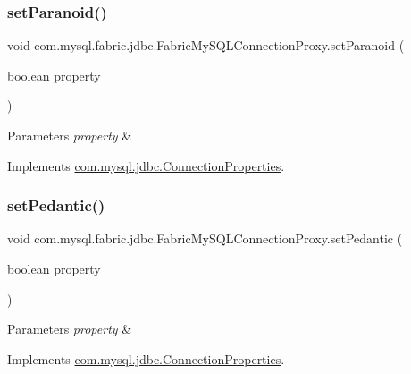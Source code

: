 \subsubsection{\texorpdfstring{set\+Paranoid()}{setParanoid()}}
{\footnotesize\ttfamily void com.\+mysql.\+fabric.\+jdbc.\+Fabric\+My\+S\+Q\+L\+Connection\+Proxy.\+set\+Paranoid (\begin{DoxyParamCaption}\item[{boolean}]{property }\end{DoxyParamCaption})}


\begin{DoxyParams}{Parameters}
{\em property} & \\
\hline
\end{DoxyParams}


Implements \mbox{\hyperlink{interfacecom_1_1mysql_1_1jdbc_1_1_connection_properties_a01cf4f506ad942b96a36708c33221a48}{com.\+mysql.\+jdbc.\+Connection\+Properties}}.

\mbox{\label{classcom_1_1mysql_1_1fabric_1_1jdbc_1_1_fabric_my_s_q_l_connection_proxy_a48c0e82fdcea0d378436b44c8e7d5fd9}} 
\subsubsection{\texorpdfstring{set\+Pedantic()}{setPedantic()}}
{\footnotesize\ttfamily void com.\+mysql.\+fabric.\+jdbc.\+Fabric\+My\+S\+Q\+L\+Connection\+Proxy.\+set\+Pedantic (\begin{DoxyParamCaption}\item[{boolean}]{property }\end{DoxyParamCaption})}


\begin{DoxyParams}{Parameters}
{\em property} & \\
\hline
\end{DoxyParams}


Implements \mbox{\hyperlink{interfacecom_1_1mysql_1_1jdbc_1_1_connection_properties_acc7191665477c54523bc25845278b99f}{com.\+mysql.\+jdbc.\+Connection\+Properties}}.

